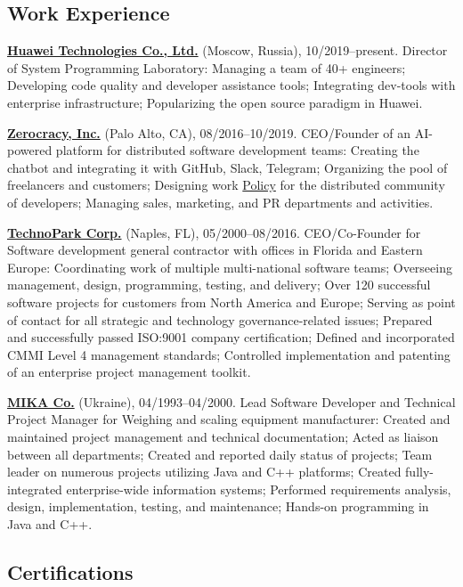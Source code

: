 \subsection*{Work Experience}

\textbf{\href{https://www.huawei.com}{Huawei Technologies Co., Ltd.}} (Moscow, Russia), 10/2019--present.
Director of System Programming Laboratory:
Managing a team of 40+ engineers;
Developing code quality and developer assistance tools;
Integrating dev-tools with enterprise infrastructure;
Popularizing the open source paradigm in Huawei.

\textbf{\href{https://www.zerocracy.com}{Zerocracy, Inc.}} (Palo Alto, CA), 08/2016--10/2019.
CEO/Founder of an AI-powered platform for distributed software development teams:
Creating the chatbot and integrating it with GitHub, Slack, Telegram;
Organizing the pool of freelancers and customers;
Designing work \href{https://www.zerocracy.com/policy.html}{Policy} for the distributed community of developers;
Managing sales, marketing, and PR departments and activities.

\textbf{\href{https://www.technoparkcorp.com}{TechnoPark Corp.}} (Naples, FL), 05/2000--08/2016.
CEO/Co-Founder for Software development general contractor with offices in Florida and Eastern Europe:
Coordinating work of multiple multi-national software teams;
Overseeing management, design, programming, testing, and delivery;
Over 120 successful software projects for customers from North America and Europe;
Serving as point of contact for all strategic and technology governance-related issues;
Prepared and successfully passed ISO:9001 company certification;
Defined and incorporated CMMI Level 4 management standards;
Controlled implementation and patenting of an enterprise project management toolkit.

\textbf{\href{http://www.mika.ua}{MIKA Co.}} (Ukraine), 04/1993--04/2000.
Lead Software Developer and Technical Project Manager for Weighing and scaling equipment manufacturer:
Created and maintained project management and technical documentation;
Acted as liaison between all departments;
Created and reported daily status of projects;
Team leader on numerous projects utilizing Java and C++ platforms;
Created fully-integrated enterprise-wide information systems;
Performed requirements analysis, design, implementation, testing, and maintenance;
Hands-on programming in Java and C++.

\subsection*{Certifications}

